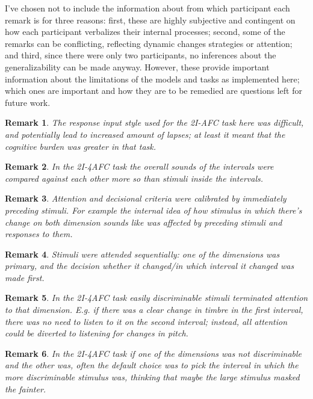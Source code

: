 \documentclass{article}\usepackage{knitr}
\newtheorem{remark}{Remark}
\begin{document}
I've chosen not to include the information about from which participant each remark is for three reasons: first, these are highly subjective and contingent on how each participant verbalizes their internal processes; second, some of the remarks can be conflicting, reflecting dynamic changes strategies or attention; and third, since there were only two participants, no inferences about the generalizability can be made anyway. However, these provide important information about the limitations of the models and tasks as implemented here; which ones are important and how they are to be remedied are questions left for future work. 

\begin{remark}
The response input style used for the 2I-AFC task here was difficult, and potentially lead to increased amount of lapses; at least it meant that the cognitive burden was greater in that task.
\end{remark}

\begin{remark}
In the 2I-4AFC task the overall sounds of the intervals were compared against each other more so than stimuli inside the intervals.
\end{remark}

\begin{remark}
Attention and decisional criteria were calibrated by immediately preceding stimuli. For example the internal idea of how stimulus in which there's change on both dimension sounds like was affected by preceding stimuli and responses to them. 
\end{remark}

\begin{remark}
Stimuli were attended sequentially: one of the dimensions was primary, and the decision whether it changed/in which interval it changed was made first. 
\end{remark}

\begin{remark}
In the 2I-4AFC task easily discriminable stimuli terminated attention to that dimension. E.g. if there was a clear change in timbre in the first interval, there was no need to listen to it on the second interval; instead, all attention could be diverted to listening for changes in pitch. 
\end{remark}

\begin{remark}
In the 2I-4AFC task if one of the dimensions was not discriminable and the other was, often the default choice was to pick the interval in which the more discriminable stimulus was, thinking that maybe the large stimulus masked the fainter.
\end{remark}
\end{document}
